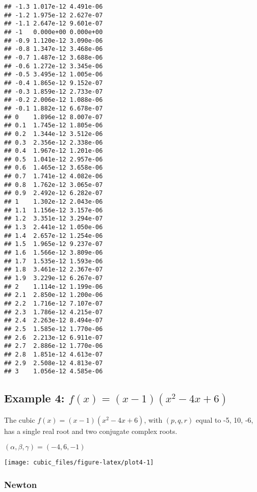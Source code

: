 \documentclass[
  12pt,
]{article}
\begin{document}
\begin{verbatim}
## -1.3 1.017e-12 4.491e-06
## -1.2 1.975e-12 2.627e-07
## -1.1 2.647e-12 9.601e-07
## -1   0.000e+00 0.000e+00
## -0.9 1.120e-12 3.090e-06
## -0.8 1.347e-12 3.468e-06
## -0.7 1.487e-12 3.688e-06
## -0.6 1.272e-12 3.345e-06
## -0.5 3.495e-12 1.005e-06
## -0.4 1.865e-12 9.152e-07
## -0.3 1.859e-12 2.733e-07
## -0.2 2.006e-12 1.088e-06
## -0.1 1.882e-12 6.678e-07
## 0    1.896e-12 8.007e-07
## 0.1  1.745e-12 1.805e-06
## 0.2  1.344e-12 3.512e-06
## 0.3  2.356e-12 2.338e-06
## 0.4  1.967e-12 1.201e-06
## 0.5  1.041e-12 2.957e-06
## 0.6  1.465e-12 3.658e-06
## 0.7  1.741e-12 4.082e-06
## 0.8  1.762e-12 3.065e-07
## 0.9  2.492e-12 6.282e-07
## 1    1.302e-12 2.043e-06
## 1.1  1.156e-12 3.157e-06
## 1.2  3.351e-12 3.294e-07
## 1.3  2.441e-12 1.050e-06
## 1.4  2.657e-12 1.254e-06
## 1.5  1.965e-12 9.237e-07
## 1.6  1.566e-12 3.809e-06
## 1.7  1.535e-12 1.593e-06
## 1.8  3.461e-12 2.367e-07
## 1.9  3.229e-12 6.267e-07
## 2    1.114e-12 1.199e-06
## 2.1  2.850e-12 1.200e-06
## 2.2  1.716e-12 7.107e-07
## 2.3  1.786e-12 4.215e-07
## 2.4  2.263e-12 8.494e-07
## 2.5  1.585e-12 1.770e-06
## 2.6  2.213e-12 6.911e-07
## 2.7  2.886e-12 1.770e-06
## 2.8  1.851e-12 4.613e-07
## 2.9  2.508e-12 4.813e-07
## 3    1.056e-12 4.585e-06
\end{verbatim}

\normalsize

\subsection{\texorpdfstring{Example 4: \(f(x)=(x-1)(x^2-4x+6)\)}{Example 4: f(x)=(x-1)(x\^{}2-4x+6)}}\label{example-4-fxx-1x2-4x6}

\footnotesize

\normalsize
The cubic \(f(x)=(x-1)(x^2-4x+6)\), with \((p,q,r)\) equal to -5, 10, -6, has
a single real root and two conjugate complex roots.

\((\alpha,\beta,\gamma)=(-4, 6, -1)\)

\footnotesize

\begin{center}\texttt{[image: cubic\_files/figure-latex/plot4-1]} \end{center}

\normalsize

\subsubsection{Newton}\label{newton-3}

\footnotesize
\end{document}
